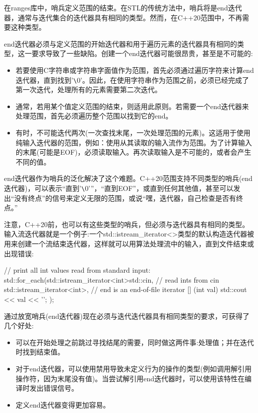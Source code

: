 在ranges库中，哨兵定义范围的结束。在STL的传统方法中，哨兵将是end迭代器，通常与迭代集合的迭代器具有相同的类型。然而，在C++20范围中，不再需要这种类型。

end迭代器必须与定义范围的开始迭代器和用于遍历元素的迭代器具有相同的类型，这一要求导致了一些缺陷。创建一个end迭代器可能很昂贵，甚至是不可能的:

\begin{itemize}
\item
若要使用C字符串或字符串字面值作为范围，首先必须通过遍历字符来计算end迭代器，直到找到'\verb|\|0'。因此，在使用字符串作为范围之前，必须已经完成了第一次迭代，处理所有的元素需要第二次迭代。

\item
通常，若用某个值定义范围的结束，则适用此原则。若需要一个end迭代器来处理范围，首先必须遍历整个范围以找到它的end。

\item
有时，不可能迭代两次(一次查找末尾，一次处理范围的元素)。这适用于使用纯输入迭代器的范围，例如：使用从其读取的输入流作为范围。为了计算输入的末尾(可能是EOF)，必须读取输入。再次读取输入是不可能的，或者会产生不同的值。
\end{itemize}

end迭代器作为哨兵的泛化解决了这个难题。C++20范围支持不同类型的哨兵(end迭代器)，可以表示“直到'\verb|\|0'”，“直到EOF”，或直到任何其他值，甚至可以发出“没有终点”的信号来定义无限的范围，或说“嘿，迭代器，自己检查是否有终点。”

注意，C++20前，也可以有这些类型的哨兵，但必须与迭代器具有相同的类型。输入流迭代器就是一个例子:一个std::istream\_iterator<>类型的默认构造迭代器被用来创建一个流结束迭代器，这样就可以用算法处理流中的输入，直到文件结束或出现错误:

\begin{cpp}
// print all int values read from standard input:
std::for_each(std::istream_iterator<int>{std::cin}, // read ints from cin
		std::istream_iterator<int>{}, // end is an end-of-file iterator
		[] (int val) {
			std::cout << val << '\n';
		});
\end{cpp}

通过放宽哨兵(end迭代器)现在必须与迭代迭代器具有相同类型的要求，可获得了几个好处:

\begin{itemize}
\item
可以在开始处理之前跳过寻找结尾的需要，同时做这两件事:处理值；并在迭代时找到结束值。

\item
对于end迭代器，可以使用禁用导致未定义行为的操作的类型(例如调用解引用操作符，因为末尾没有值)。当尝试解引用end迭代器时，可以使用该特性在编译时发出错误信号。

\item
定义end迭代器变得更加容易。
\end{itemize}

